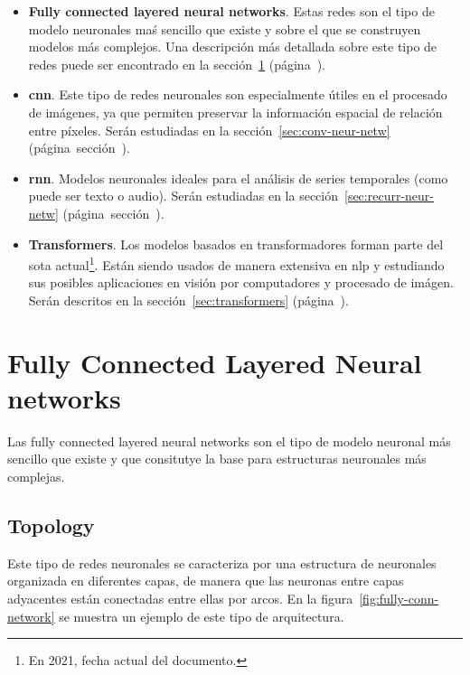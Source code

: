 \begin{itemize}
  \item \textbf{Fully connected layered neural networks}. Estas redes son el
  tipo de modelo neuronales maś sencillo que existe y sobre el que se
  construyen modelos más complejos. Una descripción más detallada sobre este
  tipo de redes puede ser encontrado en la sección~\ref{sec:fully-conn-layer}
  (página~\pageref{sec:fully-conn-layer}).
  \item \textbf{\acrlong*{cnn}}. Este tipo de redes neuronales son
  especialmente útiles en el procesado de imágenes, ya que permiten preservar
  la información espacial de relación entre píxeles. Serán estudiadas en la
  sección~\ref{sec:conv-neur-netw}
  (página~sección~\pageref{sec:conv-neur-netw}).
  \item \textbf{\acrlong*{rnn}}. Modelos neuronales ideales para el análisis
  de series temporales (como puede ser texto o audio). Serán estudiadas en la
  sección~\ref{sec:recurr-neur-netw}
  (página~sección~\pageref{sec:recurr-neur-netw}).
  \item \textbf{Transformers}. Los modelos basados en transformadores forman
  parte del \acrlong{sota} actual\footnote{En 2021, fecha actual del
    documento.}. Están siendo usados de manera extensiva en \gls{nlp} y
  estudiando sus posibles aplicaciones en visión por computadores y procesado
  de imágen. Serán descritos en la sección~\ref{sec:transformers}
  (página~\pageref{sec:transformers}).
\end{itemize}


\section{Fully Connected Layered Neural networks}
\label{sec:fully-conn-layer}

Las fully connected layered neural networks son el tipo de modelo neuronal más
sencillo que existe y que consitutye la base para estructuras neuronales más
complejas.

\subsection{Topology}
\label{sec:topology}

Este tipo de redes neuronales se caracteriza por una estructura de neuronales
organizada en diferentes capas, de manera que las neuronas entre capas
adyacentes están conectadas entre ellas por arcos. En la
figura~\ref{fig:fully-conn-network} se muestra un ejemplo de este tipo de
arquitectura.


